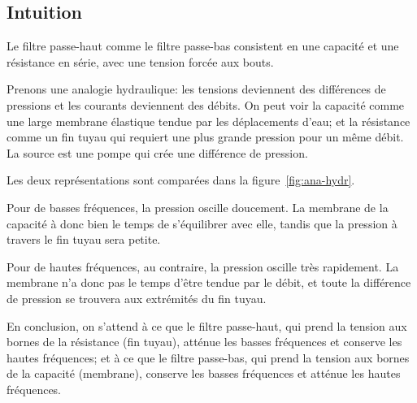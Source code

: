 \subsection{Intuition}
\label{subsec:filtres/mode/intuition}

Le filtre passe-haut comme le filtre passe-bas
consistent en une capacité et une résistance en série,
avec une tension forcée aux bouts.

Prenons une analogie hydraulique:
les tensions deviennent des différences de pressions
et les courants deviennent des débits.
On peut voir la capacité comme une large membrane élastique
tendue par les déplacements d'eau;
et la résistance comme un fin tuyau
qui requiert une plus grande pression pour un même débit.
La source est une pompe qui crée une différence de pression.

Les deux représentations sont comparées dans la figure~\ref{fig:ana-hydr}.

Pour de basses fréquences, la pression oscille doucement.
La membrane de la capacité à donc bien le temps de s'équilibrer avec elle,
tandis que la pression à travers le fin tuyau sera petite.

Pour de hautes fréquences, au contraire,
la pression oscille très rapidement.
La membrane n'a donc pas le temps d'être tendue par le débit,
et toute la différence de pression
se trouvera aux extrémités du fin tuyau.

En conclusion, on s'attend à ce que le filtre passe-haut,
qui prend la tension aux bornes de la résistance (fin tuyau),
atténue les basses fréquences et conserve les hautes fréquences;
et à ce que le filtre passe-bas,
qui prend la tension aux bornes de la capacité (membrane),
conserve les basses fréquences et atténue les hautes fréquences.
